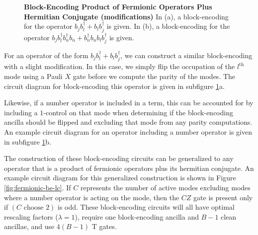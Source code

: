 \begin{figure}
    
    
    \caption{
        \textbf{Block-Encoding Product of Fermionic Operators Plus Hermitian Conjugate (modifications)}
        In (a), a block-encoding for the operator $b_j b_l^\dagger + b_l b_j^\dagger$ is given.
        In (b), a block-encoding for the operator $b_j b_l^\dagger b_n^\dagger b_n + b_n^\dagger b_n b_l b_j^\dagger$ is given.
    }
    \label{fig:fermionic-be-lc-modifications}
\end{figure}

For an operator of the form $b_j b_l^\dagger + b_l b_j^\dagger$, we can construct a similar block-encoding with a slight modification.
In this case, we simply flip the occupation of the $l^\text{th}$ mode using a Pauli $X$ gate before we compute the parity of the modes.
The circuit diagram for block-encoding this operator is given in subfigure \ref{fig:fermionic-be-lc-modifications}a.

Likewise, if a number operator is included in a term, this can be accounted for by including a $1$-control on that mode when determining if the block-encoding ancilla should be flipped and excluding that mode from any parity computations.
An example circuit diagram for an operator including a number operator is given in subfigure \ref{fig:fermionic-be-lc-modifications}b.

\begin{figure*}
    
    \caption{
        \textbf{Generalized Block-Encoding for Product of Fermionic Operators Plus Hermitian Conjugate}
        A block-encoding for the operator $b_i b_j ... b_m + b_m^\dagger ... b_j^\dagger b_i^\dagger$ is given.
        The $CZ$ gate highlighted in orange is present only if the swapping on the order of the operators in the second term induces a negative sign on the second term (an odd number of swaps are required to reorder the ladder operators).
        Block-encodings for similar operators such as those that include number operators or different arrangements of the creation and annihilation operators can be accounted for using the modifications shown in Figure \ref{fig:fermionic-be-lc-modifications}.
    }
    \label{fig:fermionic-be-lc}
\end{figure*}

The construction of these block-encoding circuits can be generalized to any operator that is a product of fermionic operators plus its hermitian conjugate.
An example circuit diagram for this generalized construction is shown in Figure \ref{fig:fermionic-be-lc}.
If $C$ represents the number of active modes excluding modes where a number operator is acting on the mode, then the $CZ$ gate is present only if $(C \text{ choose } 2)$ is odd.
These block-encoding circuits will all have optimal rescaling factors ($\lambda=1$), require one block-encoding ancilla and $B - 1$ clean ancillae, and use $4(B-1)$ T gates.

